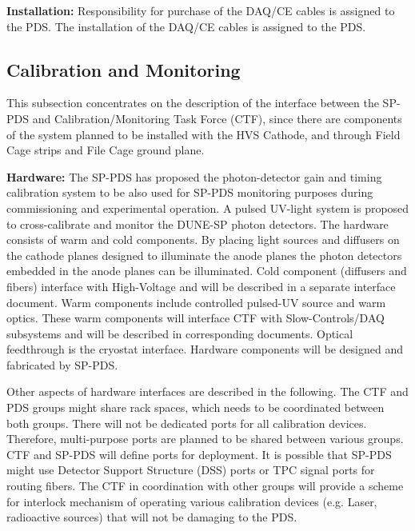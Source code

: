 \textbf{Installation: }Responsibility for purchase of the DAQ/CE cables is assigned to the PDS. The installation of the  DAQ/CE cables is assigned to the PDS.


\subsection{Calibration and Monitoring}
\label{sec:fdsp-pd-intfc-calib}

This subsection concentrates on the description of the interface between the SP-PDS and Calibration/Monitoring Task Force (CTF), since there are components of the system planned to be installed with the HVS Cathode, and through Field Cage strips and File Cage ground plane.

\textbf{Hardware:} The SP-PDS has proposed the photon-detector gain and timing calibration system to be also used for SP-PDS monitoring purposes during commissioning and experimental operation. A pulsed UV-light system is proposed to cross-calibrate and monitor the DUNE-SP photon detectors. The hardware consists of warm and cold components. By placing light sources and diffusers on the cathode planes designed to illuminate the anode planes the photon detectors embedded in the anode planes can be illuminated. Cold component (diffusers and fibers) interface with High-Voltage and will be described in a separate interface document. Warm components include controlled pulsed-UV source and warm optics. These warm components will interface CTF with Slow-Controls/DAQ subsystems and will be described in corresponding documents. Optical feedthrough is the cryostat interface. Hardware components will be designed and fabricated by SP-PDS. 

Other aspects of hardware interfaces are described in the following. The CTF and PDS groups might share rack spaces, which needs to be coordinated between both groups. There will not be dedicated ports for all calibration devices. Therefore, multi-purpose ports are planned to be shared between various groups. CTF and SP-PDS will define ports for deployment. It is possible that SP-PDS might use Detector Support Structure (DSS) ports or TPC signal ports for routing fibers. The CTF in coordination with other groups will provide a scheme for interlock mechanism of operating various calibration devices (e.g. Laser, radioactive sources) that will not be damaging to the PDS. 

